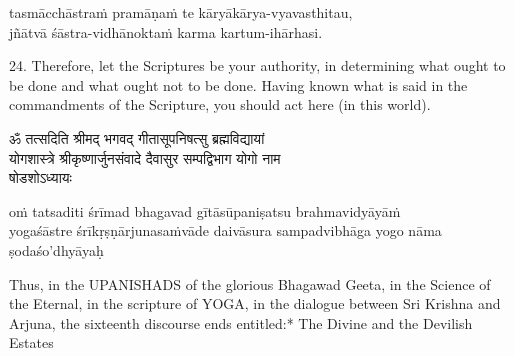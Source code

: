 \begin{transliteration}
tasmācchāstraṁ pramāṇaṁ te kāryākārya-vyavasthitau, \\
jñātvā śāstra-vidhānoktaṁ karma kartum-ihārhasi.
\end{transliteration}

24. Therefore, let the Scriptures be your authority, in determining what ought
to be done and what ought not to be done. Having known what is said in the
commandments of the Scripture, you should act here (in this world).

\begin{gitaverse}
ॐ तत्सदिति श्रीमद् भगवद् गीतासूपनिषत्सु ब्रह्मविद्यायां \\
योगशास्त्रे श्रीकृष्णार्जुनसंवादे दैवासुर सम्पद्विभाग योगो नाम \\
षोडशोऽध्यायः
\end{gitaverse}

\begin{transliteration}
oṁ tatsaditi śrīmad bhagavad gītāsūpaniṣatsu brahmavidyāyāṁ \\
yogaśāstre śrīkṛṣṇārjunasaṁvāde daivāsura sampadvibhāga yogo nāma \\
ṣodaśo'dhyāyaḥ
\end{transliteration}

Thus, in the UPANISHADS of the glorious Bhagawad Geeta, in the Science of the
Eternal, in the scripture of YOGA, in the dialogue between Sri Krishna and
Arjuna, the sixteenth discourse ends entitled:* The Divine and the Devilish
Estates
